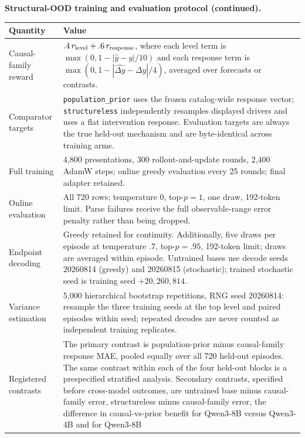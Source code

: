 \begin{center}
\begin{minipage}{\linewidth}
\centering
\scriptsize
\noindent\textbf{Structural-OOD training and evaluation protocol (continued).}\par\smallskip
\setlength{\tabcolsep}{3pt}
\begin{tabular}{p{.29\linewidth}p{.66\linewidth}}
\toprule
\textbf{Quantity} & \textbf{Value} \\
\midrule
Causal-family reward & $.4\,r_{\rm level}+.6\,r_{\rm response}$, where each level
term is $\max(0,1-|\hat y-y|/10)$ and each response term is
$\max(0,1-|\widehat{\Delta y}-\Delta y|/4)$, averaged over forecasts or contrasts. \\
Comparator targets & \texttt{population\_prior} uses the frozen catalog-wide
response vector; \texttt{structureless} independently resamples displayed drivers
and uses a flat intervention response.  Evaluation targets are always the true
held-out mechanism and are byte-identical across training arms. \\
Full training & 4,800 presentations, 300 rollout-and-update rounds, 2,400 AdamW
steps; online greedy evaluation every 25 rounds; final adapter retained. \\
Online evaluation & All 720 rows; temperature 0, top-$p=1$, one draw, 192-token
limit.  Parse failures receive the full observable-range error penalty rather than
being dropped. \\
Endpoint decoding & Greedy retained for continuity.  Additionally, five draws per
episode at temperature .7, top-$p=.95$, 192-token limit; draws are averaged within
episode.  Untrained bases use decode seeds 20260814 (greedy) and 20260815
(stochastic); trained stochastic seed is training seed $+20{,}260{,}814$. \\
Variance estimation & 5,000 hierarchical bootstrap repetitions, RNG seed 20260814:
resample the three training seeds at the top level and paired episodes within seed;
repeated decodes are never counted as independent training replicates. \\
Registered contrasts & The primary contrast is population-prior minus causal-family
response MAE, pooled equally over all 720 held-out episodes.  The same contrast
within each of the four held-out blocks is a prespecified stratified analysis.
Secondary contrasts, specified before cross-model outcomes, are untrained base minus
causal-family error, structureless minus causal-family error, the
difference in causal-vs-prior benefit for Qwen3-8B versus Qwen3-4B and for Qwen3-8B

\end{tabular}
\end{minipage}
\end{center}
